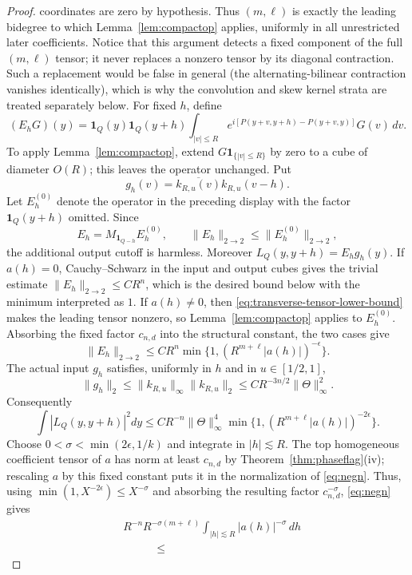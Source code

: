 \documentclass[11pt]{article}
\numberwithin{equation}{section}
\theoremstyle{remark}
\theoremstyle{definition}
\newcommand{\norm}[1]{\lVert #1\rVert}
\begin{document}
\begin{proof}
coordinates are zero by hypothesis.  Thus $(m,\ell)$ is exactly the
leading bidegree to which Lemma~\ref{lem:compactop} applies, uniformly in
all unrestricted later coefficients.
Notice that this argument detects a fixed component of the full
$(m,\ell)$ tensor; it never replaces a nonzero tensor by its diagonal
contraction.  Such a replacement would be false in general (the
alternating-bilinear contraction vanishes identically), which is why the
convolution and skew kernel strata are treated separately below.
For fixed $h$, define
\[
 (E_hG)(y)=\mathbf1_Q(y)\mathbf1_Q(y+h)
 \int_{|v|\le R}e^{i[P(y+v,y+h)-P(y+v,y)]}G(v)\,dv.
\]
To apply Lemma~\ref{lem:compactop}, extend
$G\mathbf1_{\{|v|\le R\}}$ by zero to a cube of diameter $O(R)$; this
leaves the operator unchanged.  Put
\[
 g_h(v)=\overline{k_{R,u}(v)}k_{R,u}(v-h).
\]
Let $E_h^{(0)}$ denote the operator in the preceding display with the
factor $\mathbf1_Q(y+h)$ omitted.  Since
\[
 E_h=M_{\mathbf1_{Q-h}}E_h^{(0)},
 \qquad \norm{E_h}_{2\to2}\le\norm{E_h^{(0)}}_{2\to2},
\]
the additional output cutoff is harmless.  Moreover
$L_Q(y,y+h)=E_hg_h(y)$.  If $a(h)=0$, Cauchy--Schwarz in the input and
output cubes gives the trivial estimate
$\norm{E_h}_{2\to2}\leq CR^n$, which is the desired bound below with the
minimum interpreted as $1$.  If $a(h)\ne0$, then
\eqref{eq:transverse-tensor-lower-bound} makes the leading tensor nonzero,
so Lemma~\ref{lem:compactop} applies to $E_h^{(0)}$.  Absorbing the fixed
factor $c_{n,d}$ into the structural constant, the two cases give
\[
 \norm{E_h}_{2\to2}\le CR^n
 \min\{1,(R^{m+\ell}|a(h)|)^{-\epsilon}\}.
\]
The actual input $g_h$ satisfies, uniformly in $h$ and in $u\in[1/2,1]$,
\begin{equation}\label{eq:gh-L2}
 \norm{g_h}_2\le\norm{k_{R,u}}_\infty\norm{k_{R,u}}_2
 \le CR^{-3n/2}\norm\Theta_\infty^2.
\end{equation}
Consequently
\[
 \int|L_Q(y,y+h)|^2dy
 \le CR^{-n}\norm\Theta_\infty^4
 \min\{1,(R^{m+\ell}|a(h)|)^{-2\epsilon}\}.
\]
Choose $0<\sigma<\min(2\epsilon,1/k)$ and integrate in $|h|\lesssim R$.
The top homogeneous coefficient tensor of $a$ has norm at least
$c_{n,d}$ by Theorem~\ref{thm:phaseflag}(iv); rescaling $a$ by this fixed
constant puts it in the normalization of \eqref{eq:negn}.  Thus, using
$\min(1,X^{-2\epsilon})\le X^{-\sigma}$ and absorbing the resulting
factor $c_{n,d}^{-\sigma}$, \eqref{eq:negn} gives
\[
\begin{split}
 &R^{-n}R^{-\sigma(m+\ell)}
   \int_{|h|\lesssim R}|a(h)|^{-\sigma}\,dh\\
 &\hspace{3em}\le

\end{split}\]
\end{proof}
\end{document}
